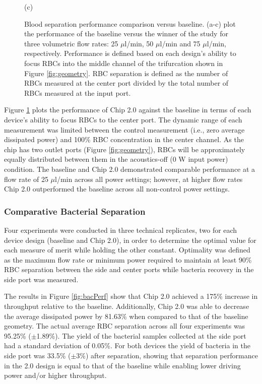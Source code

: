 \begin{figure}[H]
\begin{minipage}[t]{0.99\linewidth}
    \medskip
    \centerline{(c)}
  \end{minipage}
  \caption[Separation Performance Comparison Versus Baseline]{Blood separation performance comparison versus baseline. (a-c) plot the performance of the baseline versus the winner of the study for three volumetric flow rates: 25 $\mu$l/min, 50 $\mu$l/min and 75 $\mu$l/min, respectively. Performance is defined based on each design's ability to focus RBCs into the middle channel of the trifurcation shown in Figure \ref{fig:geometry}. RBC separation is defined as the number of RBCs measured at the center port divided by the total number of RBCs measured at the input port.}
	\label{fig:headToHeadBlood}
\end{figure}


Figure \ref{fig:headToHeadBlood} plots the performance of Chip 2.0 against the baseline in terms of each device's ability to focus RBCs to the center port. The dynamic range of each measurement was limited between the control measurement (i.e., zero average dissipated power) and 100\% RBC concentration in the center channel. As the chip has two outlet ports (Figure \ref{fig:geometry}), RBCs will be approximately equally distributed between them in the acoustics-off (0 W input power) condition. The baseline and Chip 2.0 demonstrated comparable performance at a flow rate of 25 $\mu$l/min across all power settings; however, at higher flow rates Chip 2.0 outperformed the baseline across all non-control power settings. 



\subsubsection{Comparative Bacterial Separation}
\label{sssec:comparisonBacteria}

Four experiments were conducted in three technical replicates, two for each device design (baseline and Chip 2.0),  in order to determine the optimal value for each measure of merit while holding the other constant. Optimality was defined as the maximum flow rate or minimum power required to maintain at least 90\% RBC separation between the side and center ports while bacteria recovery in the side port was measured. 

The results in Figure \ref{fig:bacPerf} show that Chip 2.0 achieved a 175\% increase in throughput relative to the baseline. Additionally, Chip 2.0 was able to decrease the average dissipated power by 81.63\% when compared to that of the baseline geometry. The actual average RBC separation across all four experiments was 95.25\% ($\pm$1.89\%). The yield of the bacterial samples collected at the side port had a standard deviation of 0.05\%.  For both devices the yield of bacteria in the side port was 33.5\% ($\pm$3\%) after separation, showing that separation performance in the 2.0 design is equal to that of the baseline while enabling lower driving power and/or higher throughput.

